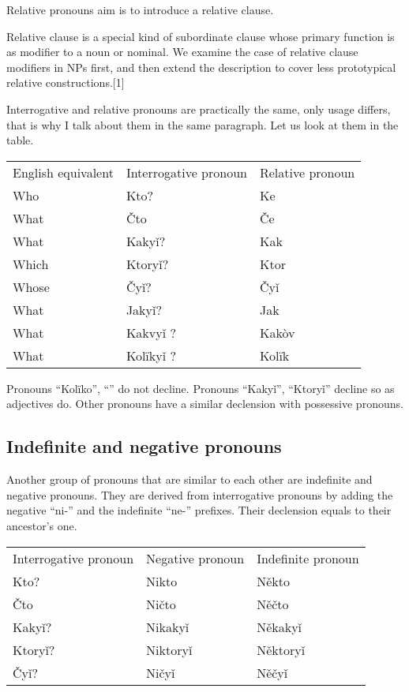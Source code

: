 Relative pronouns aim is to introduce a relative clause.

Relative clause is a special kind of subordinate clause whose primary function is as modifier to a noun or nominal. We examine the case of relative clause modifiers in NPs first, and then extend the description to cover less prototypical relative constructions.[1] 

Interrogative and relative pronouns are practically the same, only usage differs, that is why I talk about them in the same paragraph. Let us look at them in the table.

\begin{table}
	\begin{tabular}{lll}
		English equivalent & Interrogative pronoun & Relative pronoun \\
		Who & Kto? & Ke \\
		What & Čto & Če \\
		What & Kakyǐ? & Kak \\
		Which & Ktoryǐ? & Ktor \\
		Whose & Čyǐ? & Čyǐ \\
		What & Jakyǐ? & Jak \\
		What & Kakvyǐ ? & Kakòv \\
		What & Kolïkyǐ ? & Kolïk 
	\end{tabular}
\end{table}

Pronouns “Kolïko”, “” do not decline. Pronouns “Kakyǐ”, “Ktoryǐ” decline so as adjectives do. Other pronouns have a similar declension with possessive pronouns.
  
\subsection{Indefinite and negative pronouns}

Another group of pronouns that are similar to each other are indefinite and negative pronouns. They are derived from interrogative pronouns by adding the negative “ni-” and the indefinite “ne-” prefixes. Their declension equals to their ancestor’s one.

\begin{table}
	\begin{tabular}{lll}
		Interrogative pronoun & Negative pronoun & Indefinite pronoun \\
		Kto? & Nikto & Někto \\
		Čto & Ničto & Něčto \\
		Kakyǐ? & Nikakyǐ & Někakyǐ \\
		Ktoryǐ? & Niktoryǐ & Něktoryǐ \\
		Čyǐ? & Ničyǐ & Něčyǐ 
	\end{tabular}
\end{table}

